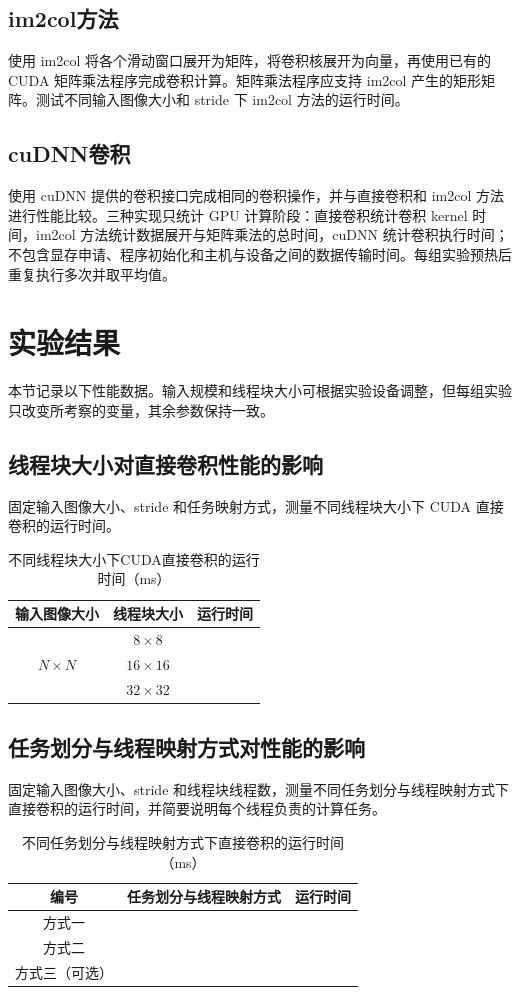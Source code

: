 \documentclass{SYSUReport}
\begin{document}
\subsection{im2col方法}
使用 im2col 将各个滑动窗口展开为矩阵，将卷积核展开为向量，再使用已有的 CUDA 矩阵乘法程序完成卷积计算。矩阵乘法程序应支持 im2col 产生的矩形矩阵。测试不同输入图像大小和 stride 下 im2col 方法的运行时间。

\subsection{cuDNN卷积}
使用 cuDNN 提供的卷积接口完成相同的卷积操作，并与直接卷积和 im2col 方法进行性能比较。三种实现只统计 GPU 计算阶段：直接卷积统计卷积 kernel 时间，im2col 方法统计数据展开与矩阵乘法的总时间，cuDNN 统计卷积执行时间；不包含显存申请、程序初始化和主机与设备之间的数据传输时间。每组实验预热后重复执行多次并取平均值。

\section{实验结果}
本节记录以下性能数据。输入规模和线程块大小可根据实验设备调整，但每组实验只改变所考察的变量，其余参数保持一致。

\subsection{线程块大小对直接卷积性能的影响}
固定输入图像大小、stride 和任务映射方式，测量不同线程块大小下 CUDA 直接卷积的运行时间。
\begin{table}[H]
\centering
\caption{不同线程块大小下CUDA直接卷积的运行时间（ms）}
\label{tab:block_size}
\begin{tabular}{|c|c|c|}
\hline
输入图像大小 & 线程块大小 & 运行时间 \\
\hline
\multirow{3}{*}{$N\times N$}
& $8\times8$   & \\
\cline{2-3}
& $16\times16$ & \\
\cline{2-3}
& $32\times32$ & \\
\hline
\end{tabular}
\end{table}

\subsection{任务划分与线程映射方式对性能的影响}
固定输入图像大小、stride 和线程块线程数，测量不同任务划分与线程映射方式下直接卷积的运行时间，并简要说明每个线程负责的计算任务。
\begin{table}[H]
\centering
\caption{不同任务划分与线程映射方式下直接卷积的运行时间（ms）}
\label{tab:mapping}
\begin{tabularx}{0.92\textwidth}{|c|X|c|}
\hline
编号 & 任务划分与线程映射方式 & 运行时间 \\
\hline
方式一 &  & \\
\hline
方式二 &  & \\
\hline
方式三（可选） &  & \\
\hline
\end{tabularx}
\end{table}
\end{document}
